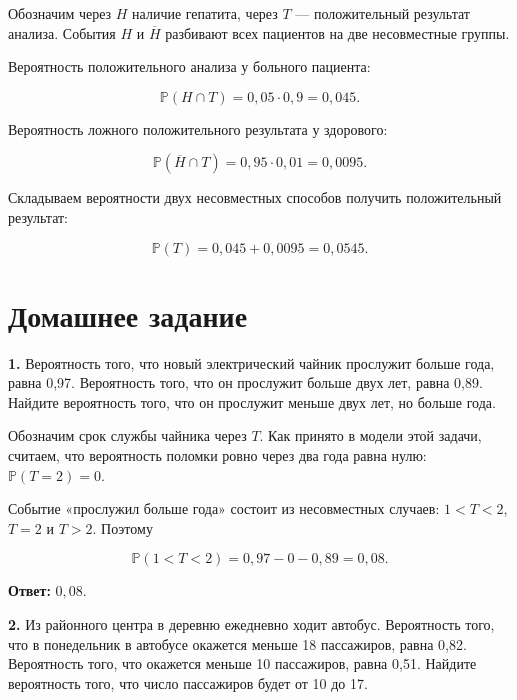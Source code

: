 \begin{solution}\label{solution-problem-solving-practice-problems-6}
Обозначим через $H$ наличие гепатита, через $T$ — положительный результат анализа. События $H$ и $\overline H$ разбивают всех пациентов на две несовместные группы.

Вероятность положительного анализа у больного пациента:

\[\mathbb P(H\cap T)=0,05\cdot0,9=0,045.\]

Вероятность ложного положительного результата у здорового:

\[\mathbb P(\overline H\cap T)=0,95\cdot0,01=0,0095.\]

Складываем вероятности двух несовместных способов получить положительный результат:

\[\mathbb P(T)=0,045+0,0095=0,0545.\]
\end{solution}

\section{Домашнее задание}

\begin{task}\label{task-homework-1}
\textbf{1.} Вероятность того, что новый электрический чайник прослужит больше года, равна 0,97. Вероятность того, что он прослужит больше двух лет, равна 0,89. Найдите вероятность того, что он прослужит меньше двух лет, но больше года.
\end{task}

\begin{solution}\label{solution-problem-solving-practice-homework-1}
Обозначим срок службы чайника через $T$. Как принято в модели этой задачи, считаем, что вероятность поломки ровно через два года равна нулю: $\mathbb P(T=2)=0$.

Событие «прослужил больше года» состоит из несовместных случаев: $1<T<2$, $T=2$ и $T>2$. Поэтому

\[\mathbb P(1<T<2)=0{,}97-0-0{,}89=0{,}08.\]

\textbf{Ответ:} $0{,}08$.
\end{solution}

\begin{task}\label{task-homework-2}
\textbf{2.} Из районного центра в деревню ежедневно ходит автобус. Вероятность того, что в понедельник в автобусе окажется меньше 18 пассажиров, равна 0,82. Вероятность того, что окажется меньше 10 пассажиров, равна 0,51. Найдите вероятность того, что число пассажиров будет от 10 до 17.
\end{task}


